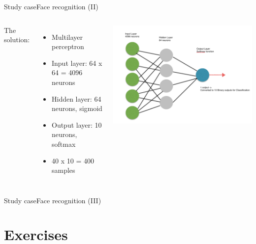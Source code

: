 \documentclass[10pt,compress]{beamer} %
\begin{document}
\begin{frame}{Study case}{Face recognition (II)}
   \begin{columns}
	   The solution:
	   \begin{itemize}
	   \item Multilayer perceptron
	   \item Input layer: 64 x 64 = 4096 neurons
	   \item Hidden layer: 64 neurons, sigmoid
	   \item Output layer: 10 neurons, softmax
	   \item 40 x 10 = 400 samples
	   \end{itemize}
		\begin{center}
		\includegraphics[width=\linewidth]{figs/nn.png}
		\end{center}
	\end{columns}
\end{frame}

\begin{frame}{Study case}{Face recognition (III)}
	\scriptsize{
    	\begin{block}{}
       \vspace{-0.2cm}
       
       \vspace{-0.2cm}
    	\end{block}
		}
\end{frame}

\section{Exercises}
\end{document}
